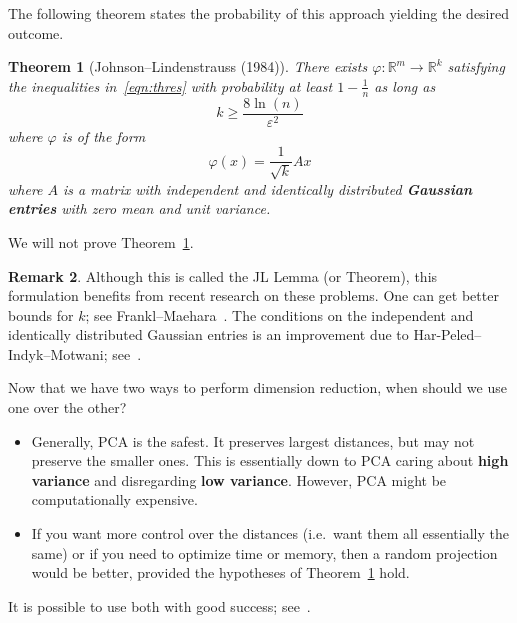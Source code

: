 \documentclass[a4paper, 12pt]{article}
\numberwithin{equation}{section}
\numberwithin{figure}{section}
\newtheorem{thm}{Theorem}[section]
\theoremstyle{definition}
\newtheorem{remark}[thm]{Remark}
\renewcommand{\geq}{\geqslant}
\newcommand{\R}{\mathbb{R}}
\begin{document}
The following theorem states the probability of this approach yielding the
desired outcome.

\begin{thm}[Johnson--Lindenstrauss (1984)]\label{thm:JL}
	There exists $\varphi: \R^m \to \R^k$ satisfying the inequalities
	in~\eqref{eqn:thres} with probability at least $1 - \frac{1}{n}$ as long as 
	\[
		k \geq \frac{8 \ln(n)}{\varepsilon^2}
	\]
	where $\varphi$ is of the form 
	\[
		\varphi(x) = \frac{1}{\sqrt{k}} A x
	\]
	where $A$ is a matrix with independent and identically distributed
	\textbf{Gaussian entries} with zero mean and unit variance.
\end{thm}

We will not prove Theorem~\ref{thm:JL}.

\begin{remark}
	Although this is called the JL Lemma (or Theorem), this formulation benefits
	from recent research on these problems. One can get better bounds for $k$;
	see Frankl--Maehara~\cite{FM/90}. The conditions on the independent and
	identically distributed Gaussian entries is an improvement due to
	Har-Peled--Indyk--Motwani; see~\cite{HPIM/12}.
\end{remark}

Now that we have two ways to perform dimension reduction, when should we use one
over the other?
\begin{itemize}
	\item Generally, PCA is the safest. It preserves largest distances, but may
	not preserve the smaller ones. This is essentially down to PCA caring about
	\textbf{high variance} and disregarding \textbf{low variance}. However, PCA
	might be computationally expensive.
	\item If you want more control over the distances (i.e.\ want them all
	essentially the same) or if you need to optimize time or memory, then a
	random projection would be better, provided the hypotheses of
	Theorem~\ref{thm:JL} hold.
\end{itemize}
It is possible to use both with good success; see~\cite{YLDW/21}.






\end{document}
